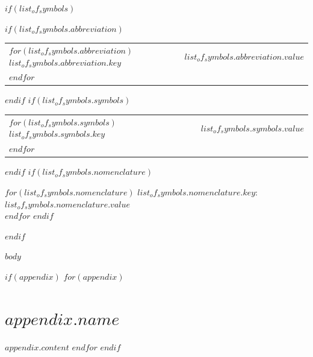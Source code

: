 \documentclass[$if(font_size)$$font_size$$else$12pt$endif$]{book}
\begin{document}
$if(list_of_symbols)$
\newpage
\doublespacing
\begin{flushleft}
    {\large\bfseries{} \par}
    \vspace{.5cm}
    \doublespacing
    $if(list_of_symbols.abbreviation)$
    {\large\bfseries{} \par}
    \vspace{.5cm}
    \begin{longtable}[l]{ll} %
    $for(list_of_symbols.abbreviation)$
    \textbf{$list_of_symbols.abbreviation.key$} & $list_of_symbols.abbreviation.value$ \\
    $endfor$
    \end{longtable}
    $endif$
    $if(list_of_symbols.symbols)$
    {\large\bfseries{} \par}
    \vspace{.5cm}
    \begin{longtable}[l]{ll} %
    $for(list_of_symbols.symbols)$
    \textbf{$list_of_symbols.symbols.key$} & $list_of_symbols.symbols.value$ \\
    $endfor$
    \end{longtable}
    $endif$
    $if(list_of_symbols.nomenclature)$
    {\large\bfseries{} \par}
    \vspace{.5cm}
    $for(list_of_symbols.nomenclature)$
    \textbf{$list_of_symbols.nomenclature.key$}: $list_of_symbols.nomenclature.value$ \\
    $endfor$
    $endif$
\end{flushleft}
$endif$

\newpage
{}
\setcounter{page}{1}
\doublespacing
\setlength{\parindent}{1.5em}
\setlength{\parskip}{0em}
\setcounter{table}{0}
$body$
\begin{appendix}
\appendix
\setcounter{table}{0}
\setcounter{figure}{0}

$if(appendix)$
$for(appendix)$
\chapter{$appendix.name$}
$appendix.content$
$endfor$
$endif$
\end{appendix}
\end{document}
